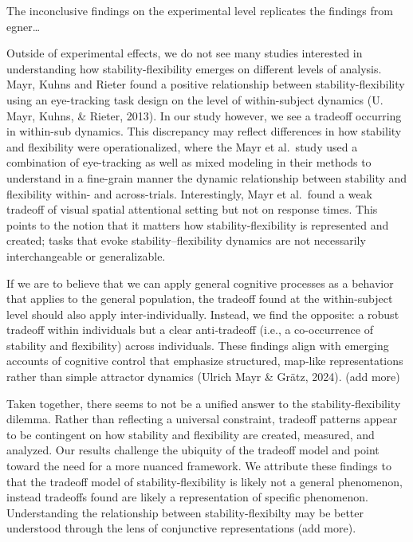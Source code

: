 \documentclass[
  english,
  man,floatsintext]{apa6}
\begin{document}
The inconclusive findings on the experimental level replicates the findings from egner\ldots{}

Outside of experimental effects, we do not see many studies interested in understanding how stability-flexibility emerges on different levels of analysis. Mayr, Kuhns and Rieter found a positive relationship between stability-flexibility using an eye-tracking task design on the level of within-subject dynamics (U. Mayr, Kuhns, \& Rieter, 2013). In our study however, we see a tradeoff occurring in within-sub dynamics. This discrepancy may reflect differences in how stability and flexibility were operationalized, where the Mayr et al.~study used a combination of eye-tracking as well as mixed modeling in their methods to understand in a fine-grain manner the dynamic relationship between stability and flexibility within- and across-trials. Interestingly, Mayr et al.~found a weak tradeoff of visual spatial attentional setting but not on response times. This points to the notion that it matters how stability-flexibility is represented and created; tasks that evoke stability--flexibility dynamics are not necessarily interchangeable or generalizable.

If we are to believe that we can apply general cognitive processes as a behavior that applies to the general population, the tradeoff found at the within-subject level should also apply inter-individually. Instead, we find the opposite: a robust tradeoff within individuals but a clear anti‑tradeoff (i.e., a co-occurrence of stability and flexibility) across individuals. These findings align with emerging accounts of cognitive control that emphasize structured, map‑like representations rather than simple attractor dynamics (Ulrich Mayr \& Grätz, 2024). (add more)

Taken together, there seems to not be a unified answer to the stability-flexibility dilemma. Rather than reflecting a universal constraint, tradeoff patterns appear to be contingent on how stability and flexibility are created, measured, and analyzed. Our results challenge the ubiquity of the tradeoff model and point toward the need for a more nuanced framework. We attribute these findings to that the tradeoff model of stability-flexibility is likely not a general phenomenon, instead tradeoffs found are likely a representation of specific phenomenon. Understanding the relationship between stability-flexibilty may be better understood through the lens of conjunctive representations (add more).

\newpage
\end{document}

